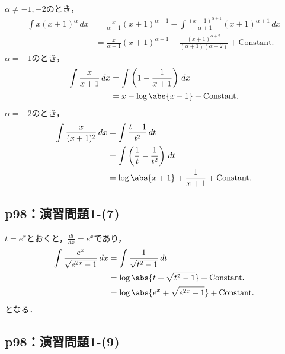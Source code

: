\documentclass[uplatex,dvipdfmx,a4paper,10pt,fleqn]{jsarticle}
\begin{document}
\begin{tleftbar}
    $\alpha \ne -1 , -2$のとき，
    \begin{align*} 
        \int x (x+1)^{\alpha} \, dx & = \frac{x}{\alpha +1} (x+1)^{\alpha+1} -\int \frac{(x+1)^{\alpha+1}}{\alpha +1} (x+1)^{\alpha+1} \, dx \\
        & = \frac{x}{\alpha +1} (x+1)^{\alpha+1} - \frac{(x+1)^{\alpha +2}}{(\alpha+1)(\alpha+2)}+ \mathrm{Constant.}
    \end{align*}
    $\alpha =-1$のとき，
    \begin{align*} 
        \int \frac{x}{x+1} \, dx & = \int \left ( 1 - \frac{1}{x+1} \right) \, dx \\
        & = x - \log \abs{x+1} + \mathrm{Constant.}
    \end{align*} 
    $ \alpha = -2$のとき，
    \begin{align*} 
        \int \frac{x}{(x+1)^2} \, dx & = \int \frac{t-1}{t^2} \, dt \\
        & = \int \left (\frac{1}{t}-\frac{1}{t^2} \right) \, dt \\
        & = \log \abs{x+1} +\frac{1}{x+1} + \mathrm{Constant.} 
    \end{align*} 
\end{tleftbar}


\subsection*{p98：演習問題1-(7)}

\begin{tleftbar}
    $ t = e^x$とおくと，$\frac{dt}{dx}=e^x$であり，
    \begin{align*} 
        \int \frac{e^x}{\sqrt{e^{2x}-1}} \, dx & = \int \frac{1}{\sqrt{t^2-1}} \, dt \\
        & = \log \abs{t+\sqrt{t^2-1}} + \mathrm{Constant.} \\
        & = \log \abs{e^x +\sqrt{e^{2x}-1}}+\mathrm{Constant.}
    \end{align*} 
    となる．
\end{tleftbar}



\subsection*{p98：演習問題1-(9)}
\end{document}
